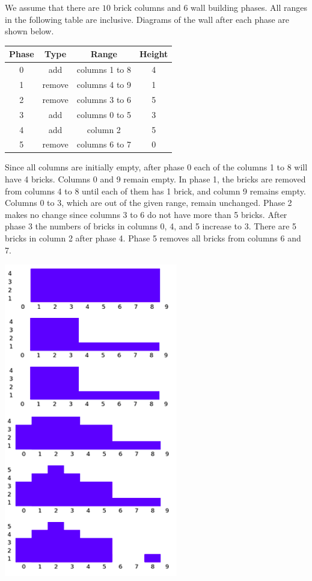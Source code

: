 We assume that there are $10$ brick columns and 6 wall building phases. All ranges in the following table are inclusive. Diagrams of the wall after each phase are shown below.

\begin{center}
\renewcommand{\arraystretch}{1.5}
\begin{tabular}{ |c|c|c|c| }
\hline
Phase & Type & Range & Height\\
\hline
0 & add & columns 1 to 8 & 4 \\
\hline
1 & remove & columns 4 to 9 & 1 \\
\hline
2 & remove & columns 3 to 6 & 5 \\
\hline
3 & add & columns 0 to 5 & 3 \\
\hline
4 & add & column 2 & 5 \\
\hline
5 & remove & columns 6 to 7 & 0 \\
\hline
\end{tabular}
\end{center}

Since all columns are initially empty, after phase 0 each of the columns 1 to 8 will have 4 bricks.
Columns 0 and 9 remain empty. In phase 1, the bricks are removed from columns 4 to 8 until each of
them has 1 brick, and column 9 remains empty. Columns 0 to 3, which are out of the given range,
remain unchanged. Phase 2 makes no change since columns 3 to 6 do not have more than 5 bricks.
After phase 3 the numbers of bricks in columns 0, 4, and 5 increase to 3. There are 5 bricks in column
2 after phase 4. Phase 5 removes all bricks from columns 6 and 7.

\includegraphics{1.png}